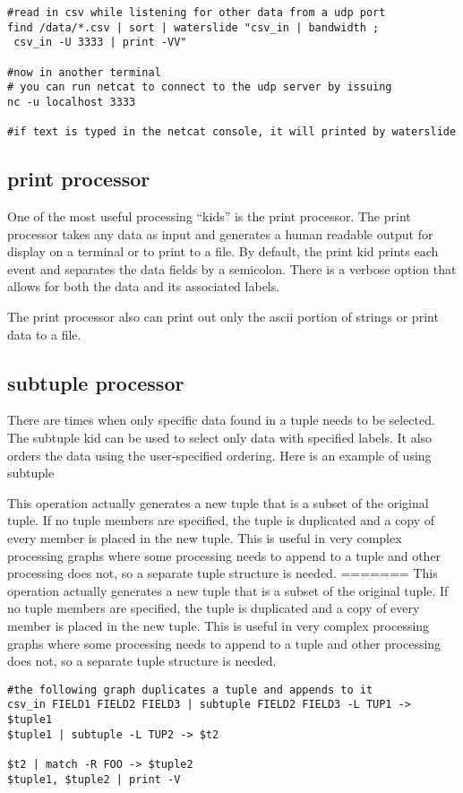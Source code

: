 \documentclass[11pt]{article}
\begin{document}
\begin{lstlisting}
#read in csv while listening for other data from a udp port
find /data/*.csv | sort | waterslide "csv_in | bandwidth ;
 csv_in -U 3333 | print -VV"

#now in another terminal
# you can run netcat to connect to the udp server by issuing
nc -u localhost 3333

#if text is typed in the netcat console, it will printed by waterslide
\end{lstlisting}

\subsection{print processor}
One of the most useful processing ``kids'' is the print processor.  The print processor takes any
data as input and generates a human readable output for display on a terminal or to print to a file.
By default, the print kid prints each event and separates the data fields by a semicolon.  There is a
verbose option that allows for both the data and its associated labels.  

The print processor also can print out only the ascii portion of strings or print data to a file.

\subsection{subtuple processor}
There are times when only specific data found in a tuple needs to be selected.  The subtuple kid can
be used to select only data with specified labels.  It also orders the data using the user-specified
ordering.  Here is an example of using subtuple

This operation actually generates a new tuple that is a subset of the
original tuple.  If no tuple members are specified, the tuple is
duplicated and a copy of every member is placed in the new tuple.
This is useful in very complex processing graphs where some processing
needs to append to a tuple and other processing does not, so a
separate tuple structure is needed.
=======
This operation actually generates a new tuple that is a subset of the 
original tuple. If no tuple members are specified, the tuple is 
duplicated and a copy of every member is placed in the new tuple.  
This is useful in very complex processing graphs where some processing 
needs to append to a tuple and other processing does not, 
so a separate tuple structure is needed.

\begin{lstlisting}
#the following graph duplicates a tuple and appends to it
csv_in FIELD1 FIELD2 FIELD3 | subtuple FIELD2 FIELD3 -L TUP1 -> $tuple1
$tuple1 | subtuple -L TUP2 -> $t2

$t2 | match -R FOO -> $tuple2
$tuple1, $tuple2 | print -V
\end{lstlisting}
\end{document}
